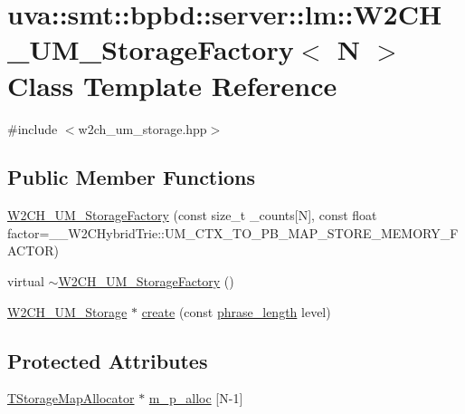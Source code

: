\hypertarget{classuva_1_1smt_1_1bpbd_1_1server_1_1lm_1_1_w2_c_h___u_m___storage_factory}{}\section{uva\+:\+:smt\+:\+:bpbd\+:\+:server\+:\+:lm\+:\+:W2\+C\+H\+\_\+\+U\+M\+\_\+\+Storage\+Factory$<$ N $>$ Class Template Reference}
\label{classuva_1_1smt_1_1bpbd_1_1server_1_1lm_1_1_w2_c_h___u_m___storage_factory}


{\ttfamily \#include $<$w2ch\+\_\+um\+\_\+storage.\+hpp$>$}

\subsection*{Public Member Functions}
\begin{DoxyCompactItemize}
\item 
\hyperlink{classuva_1_1smt_1_1bpbd_1_1server_1_1lm_1_1_w2_c_h___u_m___storage_factory_aa6ecf82dcaf503dd92af8763cb90b093}{W2\+C\+H\+\_\+\+U\+M\+\_\+\+Storage\+Factory} (const size\+\_\+t \+\_\+counts\mbox{[}N\mbox{]}, const float factor=\+\_\+\+\_\+\+W2\+C\+Hybrid\+Trie\+::\+U\+M\+\_\+\+C\+T\+X\+\_\+\+T\+O\+\_\+\+P\+B\+\_\+\+M\+A\+P\+\_\+\+S\+T\+O\+R\+E\+\_\+\+M\+E\+M\+O\+R\+Y\+\_\+\+F\+A\+C\+T\+O\+R)
\item 
virtual \hyperlink{classuva_1_1smt_1_1bpbd_1_1server_1_1lm_1_1_w2_c_h___u_m___storage_factory_ad3fa9bea0072bda045c90512c5ae8d7a}{$\sim$\+W2\+C\+H\+\_\+\+U\+M\+\_\+\+Storage\+Factory} ()
\item 
\hyperlink{classuva_1_1smt_1_1bpbd_1_1server_1_1lm_1_1_w2_c_h___u_m___storage}{W2\+C\+H\+\_\+\+U\+M\+\_\+\+Storage} $\ast$ \hyperlink{classuva_1_1smt_1_1bpbd_1_1server_1_1lm_1_1_w2_c_h___u_m___storage_factory_ab360ad98835a2d1f4ec6fb91ad35bb83}{create} (const \hyperlink{namespaceuva_1_1smt_1_1bpbd_1_1server_af068a19c2e03116caf3e3827a3e40e35}{phrase\+\_\+length} level)
\end{DoxyCompactItemize}
\subsection*{Protected Attributes}
\begin{DoxyCompactItemize}
\item 
\hyperlink{namespaceuva_1_1smt_1_1bpbd_1_1server_1_1lm_ab3c8b0f5a97fd6cd90d9fdb8bb2335c1}{T\+Storage\+Map\+Allocator} $\ast$ \hyperlink{classuva_1_1smt_1_1bpbd_1_1server_1_1lm_1_1_w2_c_h___u_m___storage_factory_a2191bc31eb8246da200e8c39a353c0f8}{m\+\_\+p\+\_\+alloc} \mbox{[}N-\/1\mbox{]}
\end{DoxyCompactItemize}


